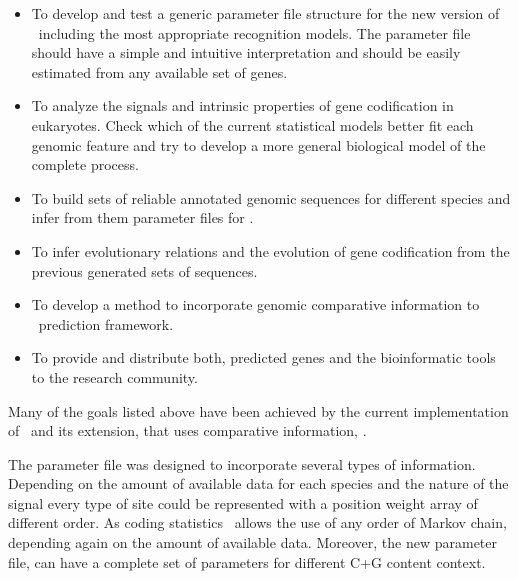 \begin{itemize}

\item To develop and test a generic parameter file structure for the 
new version of \geneid\ including the most appropriate recognition
models. The parameter file should have a simple and intuitive
interpretation and should be easily estimated from any available set
of genes.

\item To analyze the signals and intrinsic properties of gene 
codification in eukaryotes. Check which of the current statistical
models better fit each genomic feature and try to develop a more
general biological model of the complete process.

\item To build sets of reliable annotated genomic sequences for 
different species and infer from them parameter files for \geneid. 

\item To infer evolutionary relations and the evolution of gene codification 
from the previous generated sets of sequences.

\item To develop a method to incorporate genomic comparative information
to \geneid\ prediction framework. 

\item To provide and distribute both, predicted genes and the bioinformatic 
tools to the research community.

\end{itemize}

Many of the goals listed above have been achieved by the current
implementation of \geneid\ and its extension, that uses comparative
information, \sgp.



The parameter file was designed to incorporate several types of
information. Depending on the amount of available data for each
species and the nature of the signal every type of site could be
represented with a position weight array of different order. As coding
statistics \geneid\ allows the use of any order of Markov chain,
depending again on the amount of available data. Moreover, the new
parameter file, can have a complete set of parameters for different
C+G content context. 

